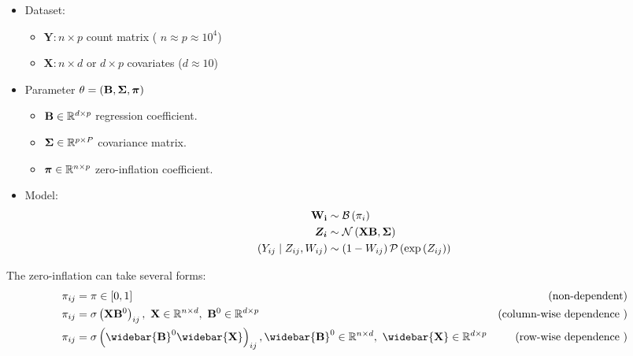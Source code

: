 \documentclass{beamer}
\theoremstyle{remark}
\begin{document}
\begin{frame}
\begin{itemize}
    \item Dataset:
    \begin{itemize}
        \item $\boldsymbol{Y}: n \times p$ count matrix ( $n \approx p \approx 10^4$)
        \item $\boldsymbol{X}: n\times d $ or $d \times p$ covariates ($d \approx 10$)
    \end{itemize}
    \item Parameter $\theta = \left(\boldsymbol{\mathbf{B}},\boldsymbol{\mathbf{\Sigma}}, \boldsymbol{\mathbf{\pi}}\right) $
    \begin{itemize}
        \item $\boldsymbol{\mathbf{B}} \in \mathbb R^{d\times p} $ regression coefficient.
        \item $\boldsymbol{\mathbf{\Sigma}} \in \mathbb R^{p\times P }$ covariance matrix.
        \item $\boldsymbol{\mathbf{\pi}} \in \mathbb R^{n\times p}$ zero-inflation coefficient.
    \end{itemize}
    \item Model:%
\begin{align*}
    \mathbf{W_{i}}  & \sim \mathbf{\mathcal{B}}\left(\pi_i\right) \\
    \boldsymbol{Z_{i}} & \sim \mathcal  N\left( \boldsymbol{\mathbf{X}} \boldsymbol{\mathbf{B}}, \boldsymbol{\mathbf{\Sigma}} \right)  \\
    \left(Y_{ij}   \mid Z_{i j}, W_{ij} \right) & \sim \left( 1- W_{ij} \right) \mathcal{P}\left(\exp \left( Z_{i j}\right)\right)
 \end{align*}
\end{itemize}
\end{frame}
\begin{frame}
    The zero-inflation can take several forms:
 \begin{subequations}
\begin{align*}
\pi_{ij}  & = \pi \in [0,1]& \text{(non-dependent)}  \\
\pi_{ij} & = \sigma\left( \mathbf X\mathbf B^0\right)_{ij}, ~ \mathbf X \in \mathbb R^{n \times d}, ~ \mathbf B^0 \in \mathbb R^{d\times p} &  \text{(column-wise dependence )} \\
\pi_{ij} & = \sigma\left(\widebar{\mathbf{B}}^0 \widebar{\mathbf{X}}\right)_{ij},  \widebar{\mathbf{B}}^0 \in \mathbb R^{n \times d}, ~ \widebar{\mathbf X} \in \mathbb R^{d\times p}& \text{(row-wise dependence )}
\end{align*}
\end{subequations}
\end{frame}
\end{document}
